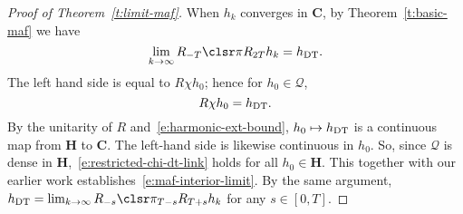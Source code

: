 \documentclass[10pt]{article}
\theoremstyle{plain}
\theoremstyle{definition}
\theoremstyle{remark}
\numberwithin{theorem}{section}
\numberwithin{example}{section}
\numberwithin{equation}{section}
\numberwithin{figure}{section}
\newcommand\DT{\ensuremath{_{\text{\normalfont DT}}}}		%
\begin{document}
\begin{proof}[Proof of Theorem~\ref{t:limit-maf}]
When $h_k$ converges in $\mathbf C$, by Theorem~\ref{t:basic-maf} we have
%
\begin{equation}
\lim_{k\to\infty} R_{-T}\clsr\pi R_{2T}h_k=h\DT.
\end{equation}
%
The left hand side is equal to $R\chi h_0$; hence for $h_0\in\mathcal Q$,
%
\begin{equation}
	R\chi h_0=h\DT.
	\label{e:restricted-chi-dt-link}
\end{equation}
%
By the unitarity of $R$ and~\eqref{e:harmonic-ext-bound}, $h_0\mapsto h\DT$ is a continuous map from $\mathbf H$ to $\mathbf C$. The left-hand side is likewise continuous in $h_0$. So, since $\mathcal Q$ is dense in $\mathbf H$,~\eqref{e:restricted-chi-dt-link} holds for all $h_0\in\mathbf H$. This together with our earlier work establishes~\eqref{e:maf-interior-limit}. By the same argument, $h\DT=\lim_{k\to\infty} R_{-s}\clsr\pi_{T-s} R_{T+s}h_k$ for any $s\in[0,T]$.
%
\end{proof}
\end{document}
